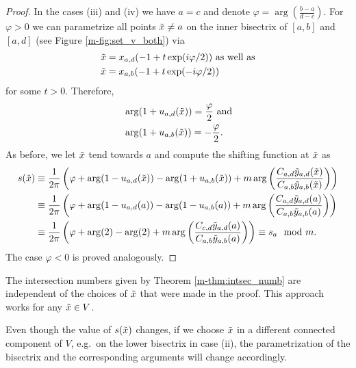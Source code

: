\documentclass[main.tex]{subfiles}
\begin{document}
\begin{proof}
  In the cases (iii) and (iv) we have $a = c$ and denote $\varphi =  \arg \left( \frac{b-a}{d-c} \right)$. For $\varphi > 0$ we can parametrize all points $\tilde{x} \ne a$ on the inner
  bisectrix of $[a,b]$ and $[a,d]$ (see Figure \ref{m-fig:set_v_both}) via
 \begin{align*}
  \tilde{x} & = x_{a,d}(-1+t \exp(i \varphi /2)) \text{  as well as} \\
  \tilde{x} & = x_{a,b}(-1+t \exp(-i \varphi/2))
 \end{align*}
 for some $t > 0$. Therefore,
 \begin{align*}
   & \arg (1+u_{a,d}(\tilde{x})) = \frac{\varphi}{2} \text{ and} \\
   & \arg (1+u_{a,b}(\tilde{x})) = -\frac{\varphi}{2}.
 \end{align*}
 As before, we let $\tilde{x}$ tend towards $a$ and compute the shifting function at $\tilde{x}$ as
 \begin{align*}
  s(\tilde{x}) & \equiv \frac{1}{2\pi} \left( \varphi + \arg(1-u_{a,d}(\tilde{x})) - \arg(1+u_{a,b}(\tilde{x})) +  m \arg \left( \frac{ C_{a,d} \tilde{y}_{a,d}(\tilde{x})}{C_{a,b}\tilde{y}_{a,b}(\tilde{x})} \right)\right) \\
	 & \equiv \frac{1}{2\pi} \left ( \varphi +\arg(1-u_{a,d}(a)) - \arg(1-u_{a,b}(a)) +  m \arg \left( \frac{ C_{a,d} \tilde{y}_{a,d}(a)}{C_{a,b}\tilde{y}_{a,b}(a)} \right)\right) \\
	 & \equiv \frac{1}{2\pi} \left( \varphi +\arg(2) - \arg(2) +  m \arg \left( \frac{ C_{c,d} \tilde{y}_{a,d}(a)}{C_{a,b}\tilde{y}_{a,b}(a)} \right)\right) \equiv s_a \mod m.
 \end{align*}
 The case $\varphi < 0$ is proved analogously.
\end{proof}

\begin{rmk}
  The intersection numbers given by Theorem \ref{m-thm:intsec_numb} are independent of the choices of $\tilde{x}$ that were made in the proof. This approach works for any $\tilde{x} \in V$.

  Even though the value of
  $s(\tilde{x})$ changes, if we choose $\tilde{x}$ in a different connected component of $V$, e.g.\ on the lower bisectrix in case (ii),
  the parametrization of the bisectrix and the corresponding arguments will change accordingly.
\end{rmk}
\end{document}
